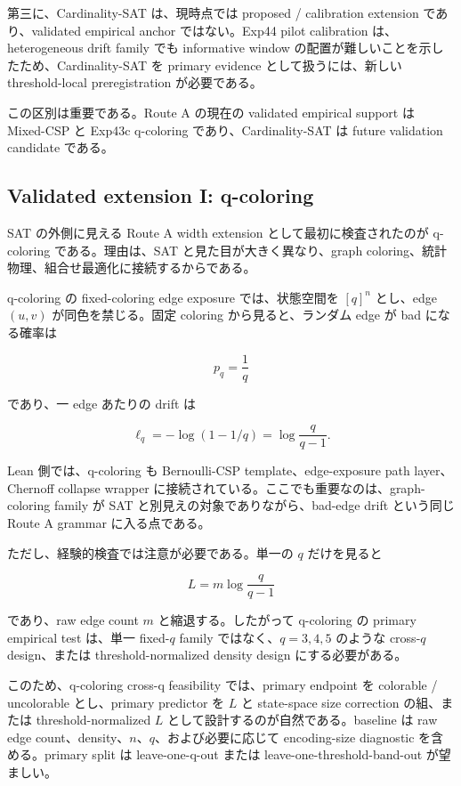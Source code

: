 \documentclass[12pt,a4paper]{article}
\begin{document}
第三に、Cardinality-SAT は、現時点では proposed / calibration extension であり、validated empirical anchor ではない。Exp44 pilot calibration は、heterogeneous drift family でも informative window の配置が難しいことを示したため、Cardinality-SAT を primary evidence として扱うには、新しい threshold-local preregistration が必要である。

この区別は重要である。Route A の現在の validated empirical support は Mixed-CSP と Exp43c q-coloring であり、Cardinality-SAT は future validation candidate である。

\subsection{Validated extension I: q-coloring}\label{validated-extension-i-q-coloring}

SAT の外側に見える Route A width extension として最初に検査されたのが q-coloring である。理由は、SAT と見た目が大きく異なり、graph coloring、統計物理、組合せ最適化に接続するからである。

q-coloring の fixed-coloring edge exposure では、状態空間を \([q]^n\) とし、edge \((u,v)\) が同色を禁じる。固定 coloring から見ると、ランダム edge が bad になる確率は

\[
p_{q}=\frac{1}{q}
\]

であり、一 edge あたりの drift は

\[
\ell_{q} = -\log(1-1/q) = \log\frac{q}{q-1}.
\]

Lean 側では、q-coloring も Bernoulli-CSP template、edge-exposure path layer、Chernoff collapse wrapper に接続されている。ここでも重要なのは、graph-coloring family が SAT と別見えの対象でありながら、bad-edge drift という同じ Route A grammar に入る点である。

ただし、経験的検査では注意が必要である。単一の \(q\) だけを見ると

\[
L=m\log\frac{q}{q-1}
\]

であり、raw edge count \(m\) と縮退する。したがって q-coloring の primary empirical test は、単一 fixed-\(q\) family ではなく、\(q=3,4,5\) のような cross-\(q\) design、または threshold-normalized density design にする必要がある。

このため、q-coloring cross-q feasibility では、primary endpoint を colorable / uncolorable とし、primary predictor を \(L\) と state-space size correction の組、または threshold-normalized \(L\) として設計するのが自然である。baseline は raw edge count、density、\(n\)、\(q\)、および必要に応じて encoding-size diagnostic を含める。primary split は leave-one-q-out または leave-one-threshold-band-out が望ましい。
\end{document}
